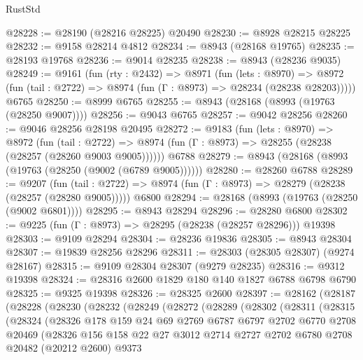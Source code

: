 \begin{lexlean}{RustStd}
\begin{coremodule}
@28228 := @28190 (@28216 @28225) @20490
@28230 := @8928 @28215 @28225
@28232 := @9158 @28214 @4812
@28234 := @8943 (@28168 @19765)
@28235 := @28193 @19768
@28236 := @9014 @28235
@28238 := @8943 (@28236 @9035)
@28249 := @9161
    (fun (rty : @2432) =>
    @8971
      (fun (lets : @8970) =>
      @8972 (fun (tail : @2722) => @8974 (fun (Γ : @8973) => @28234 (@28238 @28203)))))
    @6765
@28250 := @8999 @6765
@28255 := @8943 (@28168 (@8993 (@19763 (@28250 @9007))))
@28256 := @9043 @6765
@28257 := @9042 @28256
@28260 := @9046 @28256 @28198 @20495
@28272 := @9183
    (fun (lets : @8970) =>
    @8972
      (fun (tail : @2722) =>
      @8974 (fun (Γ : @8973) => @28255 (@28238 (@28257 (@28260 @9003 @9005))))))
    @6788
@28279 := @8943 (@28168 (@8993 (@19763 (@28250 (@9002 (@6789 @9005))))))
@28280 := @28260 @6788
@28289 := @9207
    (fun (tail : @2722) => @8974 (fun (Γ : @8973) => @28279 (@28238 (@28257 (@28280 @9005)))))
    @6800
@28294 := @28168 (@8993 (@19763 (@28250 (@9002 @6801))))
@28295 := @8943 @28294
@28296 := @28280 @6800
@28302 := @9225 (fun (Γ : @8973) => @28295 (@28238 (@28257 @28296))) @19398
@28303 := @9109 @28294
@28304 := @28236 @19836
@28305 := @8943 @28304
@28307 := @19839 @28256 @28296
@28311 := @28303 (@28305 @28307) (@9274 @28167)
@28315 := @9109 @28304 @28307 (@9279 @28235)
@28316 := @9312 @19398
@28324 := @28316 @2600 @1829 @180 @140 @1827 @6788 @6798 @6790
@28325 := @9325 @19398
@28326 := @28325 @2600
@28397 := @28162
    (@28187
      (@28228
        (@28230
          (@28232
            (@28249
              (@28272
                (@28289
                  (@28302
                    (@28311
                      (@28315
                        (@28324
                          (@28326
                            @178
                            @159
                            @24
                            @69
                            @2769
                            @6787
                            @6797
                            @2702
                            @6770
                            @2708
                            @20469
                            (@28326
                              @156
                              @158
                              @22
                              @27
                              @3012
                              @2714
                              @2727
                              @2702
                              @6780
                              @2708
                              @20482
                              (@20212 @2600)
                              @9373

\end{coremodule}
\end{lexlean}
